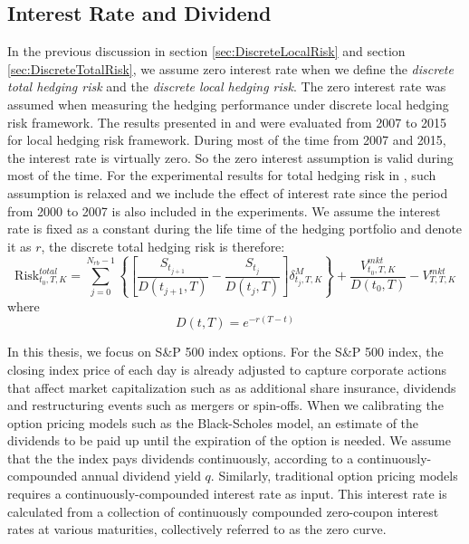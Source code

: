 \documentclass[letterpaper,12pt,titlepage,oneside,final]{book}
\numberwithin{equation}{section}
\theoremstyle{definition}
\newcommand{\Vmkt}{V^{mkt}}
\newcommand{\Smkt}{S}
\begin{document}
\subsection{Interest Rate and Dividend}
In the previous discussion in section \ref{sec:DiscreteLocalRisk} and  section \ref{sec:DiscreteTotalRisk}, we assume zero interest rate  when we define the {\em discrete total hedging risk} and the {\em discrete local hedging risk}. The zero interest rate  was assumed when measuring the hedging performance under discrete local hedging risk framework. The results presented in \cite{knian2017} and \cite{knian2019} were evaluated from 2007 to 2015 for local hedging risk framework. During  most of the time from 2007 and 2015, the interest rate is virtually zero. So the zero interest assumption is valid during most of the time.  For the experimental results for total hedging risk in \cite{knian2020}, such assumption is relaxed and we include the effect of interest rate since  the period from 2000 to 2007 is also included in the experiments. We assume the interest rate is fixed as a constant during the life time of the hedging portfolio and denote it as $r$, the discrete total hedging risk is therefore:
\begin{equation}
	\text{Risk}^{total}_{t_0,T,K}=\sum_{j=0}^{N_{rb}-1}\left\{ \left[\frac{\Smkt_{t_{j+1}}}{D(t_{j+1},T)}-\frac{\Smkt_{t_{j}}}{D(t_{j},T)}\right] \delta^M_{t_j,T,K} \right\}+\frac{\Vmkt_{t_0,T,K}}{D(t_{0},T)}-\Vmkt_{T,T,K}
 \label{eq:TotalObjV3}
\end{equation}
where
\[D(t,T)=e^{-r(T-t)}\]


In this thesis, we focus on S\&P 500 index options. For the S\&P 500 index, the closing index price of each day is already adjusted to capture corporate actions that affect market capitalization such as as additional share insurance, dividends and restructuring events such as mergers or spin-offs\cite{lassance2018comparison}. When we calibrating the  option pricing models such as the Black-Scholes model,   an estimate of the dividends to be paid up until the  expiration of the option is needed.  We assume that the the index pays dividends continuously, according to a continuously-compounded annual dividend yield $q$. Similarly, traditional option pricing models requires a continuously-compounded interest rate as input. This interest rate is calculated from a collection of continuously compounded zero-coupon interest rates at various maturities, collectively referred to as the zero curve. 
\end{document}
